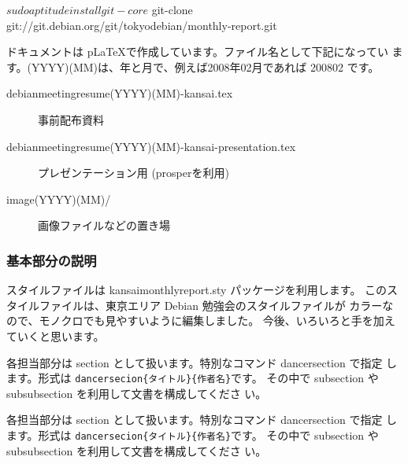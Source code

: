 \documentclass[mingoth,a4paper]{jsarticle}
\begin{document}
\begin{commandline}
 $ sudo aptitude install git-core
 $ git-clone git://git.debian.org/git/tokyodebian/monthly-report.git
\end{commandline}

ドキュメントは p\LaTeX{}で作成しています。ファイル名として下記になってい
ます。(YYYY)(MM)は、年と月で、例えば2008年02月であれば 200802 です。

\begin{description}
 \item[debianmeetingresume(YYYY)(MM)-kansai.tex]
	    事前配布資料
 \item[debianmeetingresume(YYYY)(MM)-kansai-presentation.tex]
	    プレゼンテーション用 (prosperを利用)
 \item[image(YYYY)(MM)/]
	    画像ファイルなどの置き場
\end{description}

\subsubsection{基本部分の説明}

スタイルファイルは kansaimonthlyreport.sty パッケージを利用します。
このスタイルファイルは、東京エリア Debian 勉強会のスタイルファイルが
カラーなので、モノクロでも見やすいように編集しました。
今後、いろいろと手を加えていくと思います。

\begin{commandline}
\usepackage{kansaimonthlyreport} 
\end{commandline}

各担当部分は section として扱います。特別なコマンド dancersection で指定
します。形式は \texttt{dancersecion\{タイトル\}\{作者名\}}です。
その中で subsection や subsubsection を利用して文書を構成してくださ
い。

\begin{commandline}
 \label{sec:debmtg2007howtoprepare}
\end{commandline}

各担当部分は section として扱います。特別なコマンド dancersection で指定
します。形式は \texttt{dancersecion\{タイトル\}\{作者名\}}です。
その中で subsection や subsubsection を利用して文書を構成してくださ
い。

\begin{commandline}
 \label{sec:debmtg2007howtoprepare}
\end{commandline}
\end{document}
